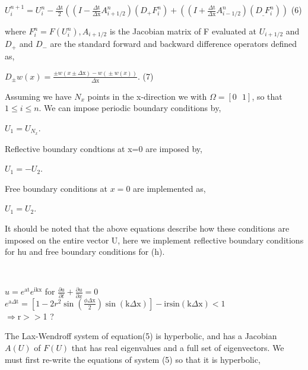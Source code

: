\documentclass{article}
\newcommand{\unicode}[1]{{}}
\begin{document}
\(U_i^{n+1}=U_i^n-\frac{\text{$\Delta $t}}{2}\left(\left(I-\frac{\text{$\Delta $t}}{\text{$\Delta $x}}A_{i+1/2}^n\right)\left(D_+F_i^n\right)+\left(\left(I+\frac{\text{$\Delta
$t}}{\text{$\Delta $x}}A_{i-1/2}^n\right)\left(D_{\_}F_i^n\right)\right)\right.\) { } { }(6)

where \(F_i^n=F\left(U_i^n\right), A_{i+1/2}\) is the Jacobian matrix of F evaluated at \(U_{i+1/2}\) and \(D_+\) and \(D_-\) are the standard forward
and backward difference operators defined as,

\(D_{\pm }w(x)=\frac{\pm w(x\pm \text{$\Delta $x})-w(\unicode{f39e}\pm w(x))}{\text{$\Delta $x}}\). { } { } { } { } (7)

Assuming we have \(N_x\) points in the x-direction we with \(\Omega =[0\text{  }1]\), so that \(1\leq i\leq n\). We can impose periodic boundary
conditions by,

\(U_1=U_{N_x}\).

Reflective boundary condtions at x=0 are imposed by,

\(U_1=-U_2\).

Free boundary conditions at \(x=0\) are implemented as,

\(U_1=U_2\).

It should be noted that the above equations describe how these conditions are imposed on the entire vector U, here we implement reflective boundary
conditions for hu and free boundary conditions for (h). 

\\




\(u=e^{\text{at}}e^{\text{ikx}}\) for \(\frac{\partial a}{\partial t}+\frac{\partial u}{\partial x}=0\)\\
\(e^{\text{a$\Delta $t}}=\left[1-2r^2\sin \left(\frac{\text{$\phi \Delta $x}}{2}\right)\sin (\text{k$\Delta $x})\right]-\text{irsin}(\text{k$\Delta
$x})<1\)\\
$\Rightarrow $r$>>$1 ?

The Lax-Wendroff system of equation(5) is hyperbolic, and has a Jacobian \(A(U)\) of \(F(U)\) that has real eigenvalues and a full set of eigenvectors.
We must first re-write the equations of system (5) so that it is hyperbolic,
\end{document}
